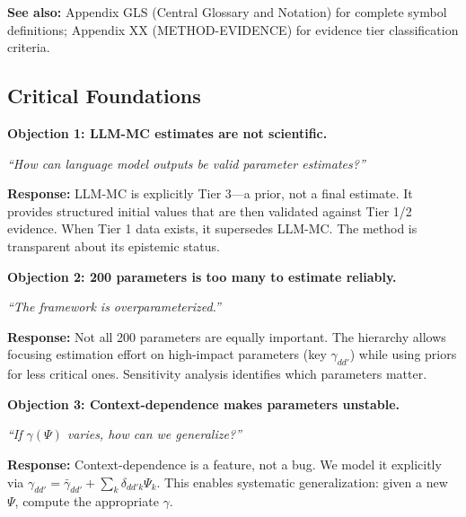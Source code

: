 \textbf{See also:} Appendix GLS (Central Glossary and Notation) for complete symbol definitions; Appendix XX (METHOD-EVIDENCE) for evidence tier classification criteria.


\subsection{Critical Foundations}
\label{sec:BBB-foundations}

\begin{tcolorbox}[colback=red!5!white, colframe=red!75!black,
    title=\textbf{Critical Foundations: Objections and Responses}]

\textbf{Objection 1: LLM-MC estimates are not scientific.}

\textit{``How can language model outputs be valid parameter estimates?''}

\textbf{Response:} LLM-MC is explicitly Tier 3---a prior, not a final estimate. It provides
structured initial values that are then validated against Tier 1/2 evidence. When Tier 1
data exists, it supersedes LLM-MC. The method is transparent about its epistemic status.

\medskip

\textbf{Objection 2: 200 parameters is too many to estimate reliably.}

\textit{``The framework is overparameterized.''}

\textbf{Response:} Not all 200 parameters are equally important. The hierarchy allows
focusing estimation effort on high-impact parameters (key $\gamma_{dd'}$) while using
priors for less critical ones. Sensitivity analysis identifies which parameters matter.

\medskip

\textbf{Objection 3: Context-dependence makes parameters unstable.}

\textit{``If $\gamma(\Psi)$ varies, how can we generalize?''}

\textbf{Response:} Context-dependence is a feature, not a bug. We model it explicitly
via $\gamma_{dd'} = \bar{\gamma}_{dd'} + \sum_k \delta_{dd'k} \Psi_k$. This enables
systematic generalization: given a new $\Psi$, compute the appropriate $\gamma$.

\end{tcolorbox}

